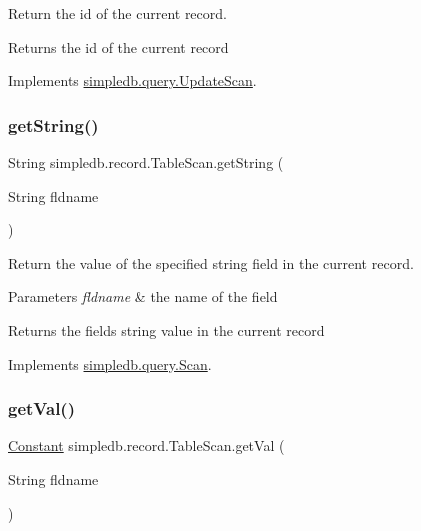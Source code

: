Return the id of the current record. \begin{DoxyReturn}{Returns}
the id of the current record 
\end{DoxyReturn}


Implements \hyperlink{interfacesimpledb_1_1query_1_1UpdateScan_aa98f38fa6d4fc66862e0c739b577ce2d}{simpledb.\+query.\+Update\+Scan}.

\mbox{\label{classsimpledb_1_1record_1_1TableScan_af43f30e2489c5cd23566cb60271db331}} 
\subsubsection{\texorpdfstring{get\+String()}{getString()}}
{\footnotesize\ttfamily String simpledb.\+record.\+Table\+Scan.\+get\+String (\begin{DoxyParamCaption}\item[{String}]{fldname }\end{DoxyParamCaption})\hspace{0.3cm}{\ttfamily [inline]}}

Return the value of the specified string field in the current record. 
\begin{DoxyParams}{Parameters}
{\em fldname} & the name of the field \\
\hline
\end{DoxyParams}
\begin{DoxyReturn}{Returns}
the field\textquotesingle{}s string value in the current record 
\end{DoxyReturn}


Implements \hyperlink{interfacesimpledb_1_1query_1_1Scan_a922e219fee53ecfa6163525f9e3ef222}{simpledb.\+query.\+Scan}.

\mbox{\label{classsimpledb_1_1record_1_1TableScan_a0a4ad2c10c2c60f3c984876c672e15e1}} 
\subsubsection{\texorpdfstring{get\+Val()}{getVal()}}
{\footnotesize\ttfamily \hyperlink{classsimpledb_1_1query_1_1Constant}{Constant} simpledb.\+record.\+Table\+Scan.\+get\+Val (\begin{DoxyParamCaption}\item[{String}]{fldname }\end{DoxyParamCaption})\hspace{0.3cm}{\ttfamily [inline]}}


